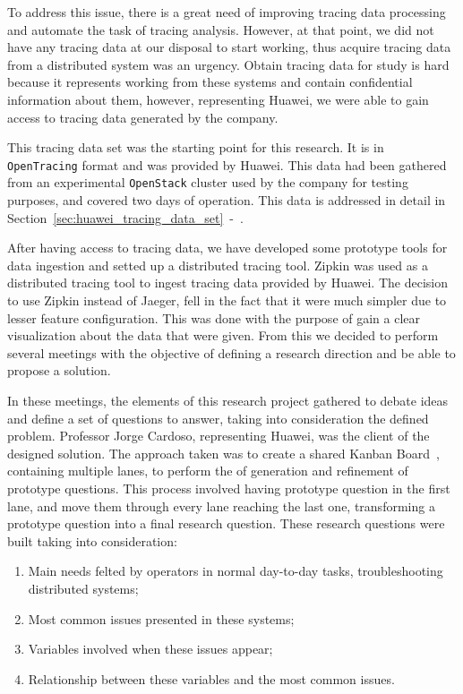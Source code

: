 To address this issue, there is a great need of improving tracing data processing and automate the task of tracing analysis. However, at that point, we did not have any tracing data at our disposal to start working, thus acquire tracing data from a distributed system was an urgency. Obtain tracing data for study is hard because it represents working from these systems and contain confidential information about them, however, representing Huawei, we were able to gain access to tracing data generated by the company.

This tracing data set was the starting point for this research. It is in \texttt{OpenTracing} format and was provided by Huawei. This data had been gathered from an experimental \texttt{OpenStack} cluster used by the company for testing purposes, and covered two days of operation. This data is addressed in detail in Section~\ref{sec:huawei_tracing_data_set}~-~.

After having access to tracing data, we have developed some prototype tools for data ingestion and setted up a distributed tracing tool. Zipkin was used as a distributed tracing tool to ingest tracing data provided by Huawei. The decision to use Zipkin instead of Jaeger, fell in the fact that it were much simpler due to lesser feature configuration. This was done with the purpose of gain a clear visualization about the data that were given. From this we decided to perform several meetings with the objective of defining a research direction and be able to propose a solution.

In these meetings, the elements of this research project gathered to debate ideas and define a set of questions to answer, taking into consideration the defined problem. Professor Jorge Cardoso, representing Huawei, was the client of the designed solution. The approach taken was to create a shared Kanban Board~\cite{Ikonen2011}, containing multiple lanes, to perform the of generation and refinement of prototype questions. This process involved having prototype question in the first lane, and move them through every lane reaching the last one, transforming a prototype question into a final research question. These research questions were built taking into consideration:

\begin{enumerate}
    \item Main needs felted by operators in normal day-to-day tasks, troubleshooting distributed systems;
    \item Most common issues presented in these systems;
    \item Variables involved when these issues appear;
    \item Relationship between these variables and the most common issues.
\end{enumerate}

